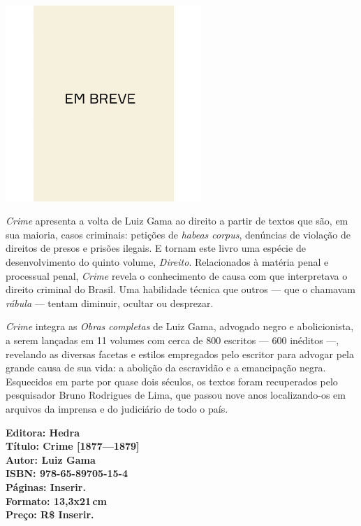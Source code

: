 \begin{center}
\hspace*{.5cm}\includegraphics[width=74mm]{./CAPAS/breve.jpeg}
\end{center}
\hspace*{-7cm}\hrulefill\hspace*{-7cm}
\medskip

\noindent{}\textit{Crime} apresenta a volta de Luiz Gama ao direito a partir de textos que são, em sua maioria, casos criminais: petições de \textit{habeas corpus}, denúncias de violação de direitos de presos e prisões ilegais. E tornam este livro uma espécie de desenvolvimento do quinto volume, \textit{Direito}. Relacionados à matéria penal e processual penal, \textit{Crime} revela o conhecimento de causa com que interpretava o direito criminal do Brasil. Uma habilidade técnica que outros --- que o chamavam \textit{rábula} --- tentam diminuir, ocultar ou desprezar.

\textit{Crime} integra as \textit{Obras completas} de Luiz Gama, advogado negro e abolicionista, a serem lançadas em 11 volumes com cerca de 800 escritos --- 600 inéditos ---, revelando as diversas facetas e estilos empregados pelo escritor para advogar pela grande causa de sua vida: a abolição da escravidão e a emancipação negra. Esquecidos em parte por quase dois séculos, os textos foram recuperados pelo pesquisador Bruno Rodrigues de Lima, que passou nove anos localizando-os em arquivos da imprensa e do judiciário de todo o país.

\vfill
\noindent\begin{minipage}[c]{1\linewidth}
{\small\textbf{
\hspace*{-.1cm}Editora: Hedra\\
Título: Crime [1877—1879]\\
Autor: Luiz Gama\\ 
ISBN: 978-65-89705-15-4\\
Páginas: Inserir.\\
Formato: 13,3x21\,cm\\
Preço: R\$ Inserir.\\
}}
\end{minipage}
\pagebreak

